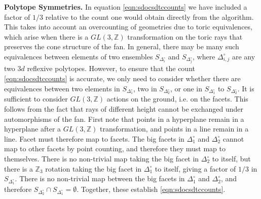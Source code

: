 \documentclass[aps,prl,twocolumn, superscriptaddress,groupedaddress,nofootinbib]{revtex4-1}
\newcommand{\bZ}{\mathbb{Z}}
\newcommand{\sdoc}{S_{\Delta_1^\circ}}
\newcommand{\sdtc}{S_{\Delta_2^\circ}}
\newcommand{\doc}{{\Delta_1^\circ}}
\newcommand{\dtc}{{\Delta_2^\circ}}
\begin{document}
\vspace{.2cm}
\noindent \textbf{Polytope Symmetries.}
In equation \eqref{eqn:sdocsdtccounts} 
we have included a factor of
$1/3$ relative to the count one would obtain directly from the algorithm.
This takes into account an overcounting of geometries due to toric equivalences,
which arise when there is a $GL(3,\bZ)$ transformation on the toric rays
that preserves the cone structure of the fan. In general, there may
be many such equivalences between elements of two ensembles $S_{\Delta_i^\circ}$
and $S_{\Delta_j^\circ}$, where $\Delta_{i,j}^\circ$ are any two $3d$ reflexive
polytopes. However, to ensure that the count  \eqref{eqn:sdocsdtccounts} is accurate,
we only need to consider whether there are equivalences between
two elements in $\sdoc$, two in $\sdtc$, or one in $\sdoc$ to $\sdtc$. It is sufficient to consider $GL(3,\bZ)$ actions
on the ground, i.e. on the facets. This follows from the fact that rays of different height cannot be exchanged under automorphisms of the fan. First note that points in a hyperplane remain in a
hyperplane after a $GL(3,\bZ)$ transformation, and points
in a line remain in a line. Facet must therefore map to
facets. The big facets in $\doc$ and $\dtc$ cannot map
to other facets by point counting, and therefore they
must map to themselves. There is no non-trivial map
taking the big facet in $\dtc$ to itself, but there is
a $\bZ_3$ rotation taking the big facet in $\doc$ to itself, giving a factor of $1/3$ in $\sdoc$. There is no non-trivial
map between the big facets in $\doc$ and $\dtc$, and therefore
$\sdtc\cap \sdoc  = \emptyset.$ Together, these establish
\eqref{eqn:sdocsdtccounts}.
\end{document}
